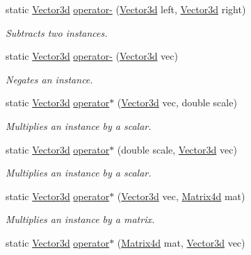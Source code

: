 \begin{DoxyCompactItemize}
static \hyperlink{struct_open_t_k_1_1_vector3d}{Vector3d} \hyperlink{struct_open_t_k_1_1_vector3d_a10aef80dffe323a3c43db9329adff1c2}{operator-\/} (\hyperlink{struct_open_t_k_1_1_vector3d}{Vector3d} left, \hyperlink{struct_open_t_k_1_1_vector3d}{Vector3d} right)
\begin{DoxyCompactList}\small\item\em Subtracts two instances. \end{DoxyCompactList}\item 
static \hyperlink{struct_open_t_k_1_1_vector3d}{Vector3d} \hyperlink{struct_open_t_k_1_1_vector3d_a1ac5dcc8891cc0d8eeb309e2ef4fd87b}{operator-\/} (\hyperlink{struct_open_t_k_1_1_vector3d}{Vector3d} vec)
\begin{DoxyCompactList}\small\item\em Negates an instance. \end{DoxyCompactList}\item 
static \hyperlink{struct_open_t_k_1_1_vector3d}{Vector3d} \hyperlink{struct_open_t_k_1_1_vector3d_aa1c51b2bbe6e2adf39b63e9c6e09af40}{operator$\ast$} (\hyperlink{struct_open_t_k_1_1_vector3d}{Vector3d} vec, double scale)
\begin{DoxyCompactList}\small\item\em Multiplies an instance by a scalar. \end{DoxyCompactList}\item 
static \hyperlink{struct_open_t_k_1_1_vector3d}{Vector3d} \hyperlink{struct_open_t_k_1_1_vector3d_aab0e909ef74f4f29f9b307183b55a300}{operator$\ast$} (double scale, \hyperlink{struct_open_t_k_1_1_vector3d}{Vector3d} vec)
\begin{DoxyCompactList}\small\item\em Multiplies an instance by a scalar. \end{DoxyCompactList}\item 
static \hyperlink{struct_open_t_k_1_1_vector3d}{Vector3d} \hyperlink{struct_open_t_k_1_1_vector3d_a8ab18f6f16bb04b10b60b23956ec329c}{operator$\ast$} (\hyperlink{struct_open_t_k_1_1_vector3d}{Vector3d} vec, \hyperlink{struct_open_t_k_1_1_matrix4d}{Matrix4d} mat)
\begin{DoxyCompactList}\small\item\em Multiplies an instance by a matrix. \end{DoxyCompactList}\item 
static \hyperlink{struct_open_t_k_1_1_vector3d}{Vector3d} \hyperlink{struct_open_t_k_1_1_vector3d_acb92a8ba0d2439567b09d503a5388369}{operator$\ast$} (\hyperlink{struct_open_t_k_1_1_matrix4d}{Matrix4d} mat, \hyperlink{struct_open_t_k_1_1_vector3d}{Vector3d} vec)

\end{DoxyCompactItemize}
